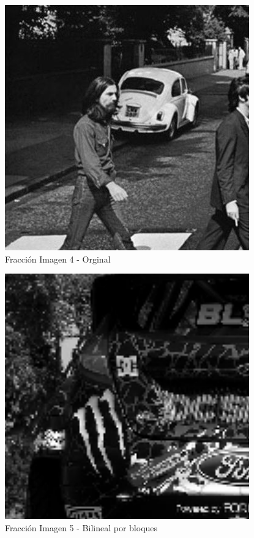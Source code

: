 \documentclass[a4paper]{article}
\begin{document}
     \begin{figure}[H]
    \centering
    \includegraphics[scale=0.5]{imagenes/imagen4informeOriginal.png}
    \caption{Fracci\'on Imagen 4 - Orginal}
    \end{figure}

     \begin{figure}[H]
    \centering
    \includegraphics[scale=0.5]{imagenes/imagen5informe.png}
    \caption{Fracci\'on Imagen 5 - Bilineal por bloques}
    \end{figure}
\end{document}
